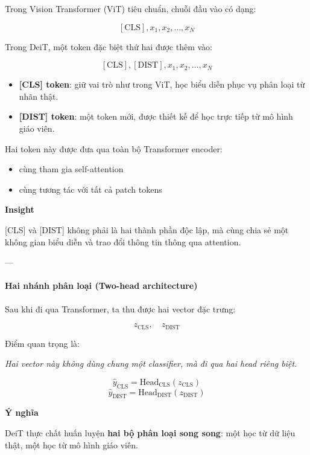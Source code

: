 Trong Vision Transformer (ViT) tiêu chuẩn, chuỗi đầu vào có dạng:

\[
[\text{CLS}], x_1, x_2, \dots, x_N
\]

Trong DeiT, một token đặc biệt thứ hai được thêm vào:

\[
[\text{CLS}], [\text{DIST}], x_1, x_2, \dots, x_N
\]

\begin{itemize}
	\item \textbf{[CLS] token}: giữ vai trò như trong ViT, học biểu diễn phục vụ phân loại từ nhãn thật.
	\item \textbf{[DIST] token}: một token mới, được thiết kế để học trực tiếp từ mô hình giáo viên.
\end{itemize}

Hai token này được đưa qua toàn bộ Transformer encoder:
\begin{itemize}
	\item cùng tham gia self-attention
	\item cùng tương tác với tất cả patch tokens
\end{itemize}

\begin{mdframed}[style=infobox]
	\textbf{Insight}
	
	[CLS] và [DIST] không phải là hai thành phần độc lập, mà cùng chia sẻ một không gian biểu diễn và trao đổi thông tin thông qua attention.
\end{mdframed}

---

\paragraph{Hai nhánh phân loại (Two-head architecture)}

Sau khi đi qua Transformer, ta thu được hai vector đặc trưng:

\[
z_{\text{CLS}}, \quad z_{\text{DIST}}
\]

Điểm quan trọng là:

\begin{center}
	\textit{Hai vector này không dùng chung một classifier, mà đi qua hai head riêng biệt.}
\end{center}

\[
\hat{y}_{\text{CLS}} = \text{Head}_{\text{CLS}}(z_{\text{CLS}})
\]
\[
\hat{y}_{\text{DIST}} = \text{Head}_{\text{DIST}}(z_{\text{DIST}})
\]

\begin{mdframed}[style=infobox]
	\textbf{Ý nghĩa}
	
	DeiT thực chất huấn luyện \textbf{hai bộ phân loại song song}:  
	một học từ dữ liệu thật, một học từ mô hình giáo viên.
\end{mdframed}

